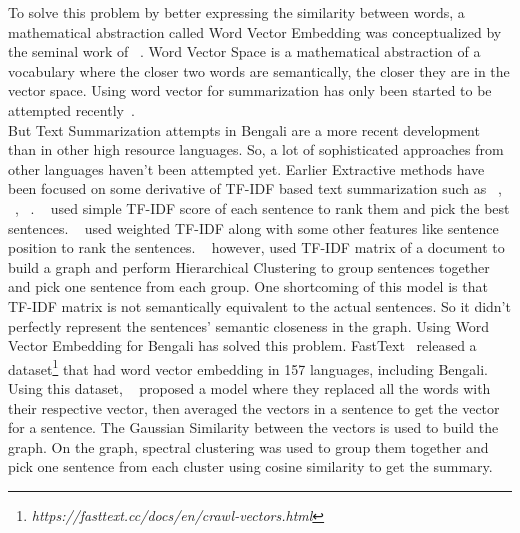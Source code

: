 To solve this problem by better expressing the similarity between words,
a mathematical abstraction called Word Vector Embedding was conceptualized by the seminal
work of \citeauthor{salton-1975-word-vector}~\cite{salton-1975-word-vector}.
Word Vector Space is a mathematical abstraction of a vocabulary where the closer two words
are semantically, the closer they are in the vector space.
Using word vector for summarization has only been started
to be attempted recently~\cite{Jain-2017-word-vector-embedding-summary}.\\

But Text Summarization attempts in Bengali are a more recent development than in other high resource languages.
So, a lot of sophisticated approaches from other languages haven't been attempted yet.
Earlier Extractive methods have been focused on some derivative of TF-IDF based text
summarization such as \citeauthor{chowdhury-etal-2021-tfidf-clustering}~\cite{chowdhury-etal-2021-tfidf-clustering},
\citeauthor{das-2022-tfidf}~\cite{das-2022-tfidf}, \citeauthor{sarkar-2012-tfidf}~\cite{sarkar-2012-tfidf}.
\citeauthor{sarkar-2012-tfidf}~\cite{sarkar-2012-tfidf} used simple TF-IDF score of each sentence to rank them and
pick the best sentences.
\citeauthor{das-2022-tfidf}~\cite{das-2022-tfidf} used weighted TF-IDF along with some other features like sentence position
to rank the sentences.
\citeauthor{chowdhury-etal-2021-tfidf-clustering}~\cite{chowdhury-etal-2021-tfidf-clustering} however, used TF-IDF
matrix of a document to build a graph and perform Hierarchical Clustering to group sentences together and pick one
sentence from each group.
One shortcoming of this model is that TF-IDF matrix is not semantically equivalent to the actual sentences.
So it didn't perfectly represent the sentences' semantic closeness in the graph.
Using Word Vector Embedding for Bengali has solved this problem.
FastText~\cite{grave-etal-2018-fasttext} released a dataset\footnote{\textit{https://fasttext.cc/docs/en/crawl-vectors.html}}
that had word vector embedding in 157 languages, including Bengali.
Using this dataset, \citeauthor{roychowdhury-etal-2022-spectral-base}~\cite{roychowdhury-etal-2022-spectral-base}
proposed a model where they replaced all the words with their respective vector, then averaged the vectors in a
sentence to get the vector for a sentence.
The Gaussian Similarity between the vectors is used to build the graph.
On the graph, spectral clustering was used to group them together and pick one sentence from each cluster using cosine
similarity to get the summary.\\

